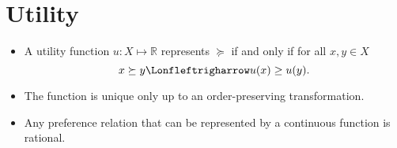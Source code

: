 \documentclass{article}
\begin{document}
\section{Utility}


\begin{itemize}
		\item A utility function $u:X \mapsto \mathbb{R} $ represents $\succeq$ if and only if for all  $x,y \in X$ 
				\[
				x \succeq y \Lonfleftrigharrow u(x) \geq u(y)
				.\] 
		\item The function is unique only up to an order-preserving transformation.
		\item Any preference relation that can be represented by a continuous function is rational.
\end{itemize}
\end{document}
